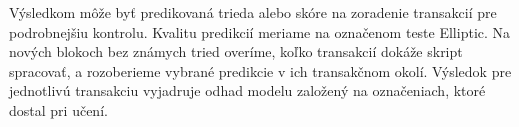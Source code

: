 Výsledkom môže byť predikovaná trieda alebo skóre na zoradenie
transakcií pre podrobnejšiu kontrolu. Kvalitu predikcií meriame
na označenom teste Elliptic. Na nových blokoch bez známych tried
overíme, koľko transakcií dokáže skript spracovať, a rozoberieme
vybrané predikcie v ich transakčnom okolí. Výsledok pre jednotlivú
transakciu vyjadruje odhad modelu založený na označeniach, ktoré
dostal pri učení.

%
%
%
